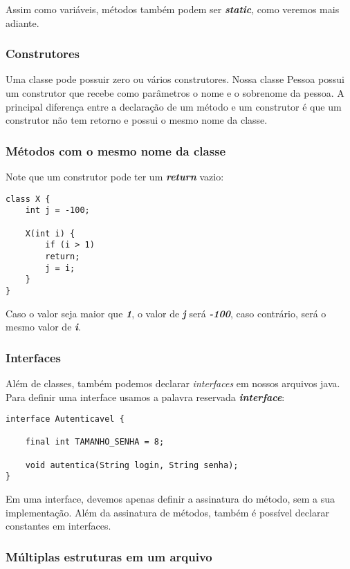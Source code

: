 \documentclass[12pt]{article}
\begin{document}
Assim como variáveis, métodos também podem ser \textbf{\textit{static}}, como veremos mais adiante.

\subsubsection{Construtores}

Uma classe pode possuir zero ou vários construtores. Nossa classe Pessoa possui um construtor que recebe como parâmetros o nome e o sobrenome da pessoa. A principal diferença entre a declaração de um método e um construtor é que um construtor não tem retorno e possui o mesmo nome da classe.

\subsubsection{Métodos com o mesmo nome da classe}

Note que um construtor pode ter um \textbf{\textit{return}} vazio:

\begin{lstlisting}
class X {
	int j = -100;
	
	X(int i) {
		if (i > 1)
		return;
		j = i;
	}
}
\end{lstlisting}

Caso o valor seja maior que \textbf{\textit{1}}, o valor de \textbf{\textit{j}} será \textbf{\textit{-100}}, caso contrário, será o mesmo valor de \textbf{\textit{i}}.

\subsubsection{Interfaces}

Além de classes, também podemos declarar \textit{interfaces} em nossos arquivos java. Para definir uma interface usamos a palavra reservada \textbf{\textit{interface}}:

\begin{lstlisting}
interface Autenticavel {
	
	final int TAMANHO_SENHA = 8;
	
	void autentica(String login, String senha);
}
\end{lstlisting}

Em uma interface, devemos apenas definir a assinatura do método, sem a sua implementação. Além da assinatura de métodos, também é possível declarar constantes em interfaces.

\subsubsection{Múltiplas estruturas em um arquivo}
\end{document}
